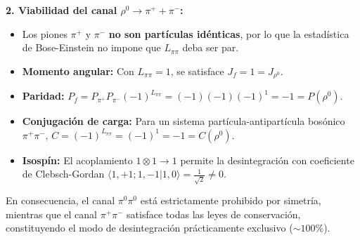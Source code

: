 \begin{problema}
\textbf{2. Viabilidad del canal $\rho^0 \to \pi^+ + \pi^-$:}
\begin{itemize}
    \item Los piones $\pi^+$ y $\pi^-$ \textbf{no son partículas idénticas}, por lo que la estadística de Bose-Einstein no impone que $L_{\pi\pi}$ deba ser par.
    \item \textbf{Momento angular:} Con $L_{\pi\pi} = 1$, se satisface $J_f = 1 = J_{\rho^0}$.
    \item \textbf{Paridad:} $P_f = P_{\pi^+} P_{\pi^-} (-1)^{L_{\pi\pi}} = (-1)(-1)(-1)^1 = -1 = P(\rho^0)$.
    \item \textbf{Conjugación de carga:} Para un sistema partícula-antipartícula bosónico $\pi^+\pi^-$, $C = (-1)^{L_{\pi\pi}} = (-1)^1 = -1 = C(\rho^0)$.
    \item \textbf{Isospín:} El acoplamiento $1 \otimes 1 \to 1$ permite la desintegración con coeficiente de Clebsch-Gordan $\langle 1, +1; 1, -1 | 1, 0 \rangle = \frac{1}{\sqrt{2}} \neq 0$.
\end{itemize}

En consecuencia, el canal $\pi^0\pi^0$ está estrictamente prohibido por simetría, mientras que el canal $\pi^+\pi^-$ satisface todas las leyes de conservación, constituyendo el modo de desintegración prácticamente exclusivo ($\sim 100\%$).
\end{problema}

